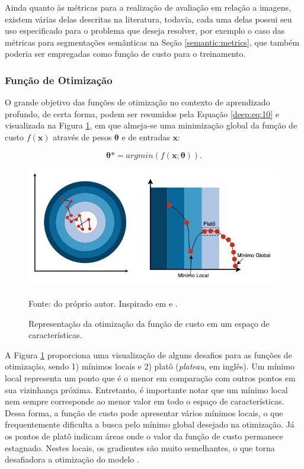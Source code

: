 Ainda quanto às métricas para a realização de avaliação em relação a imagens, existem várias delas descritas na literatura, todavia,  cada uma delas possui seu uso especificado para o problema que deseja resolver, por exemplo o caso das métricas para segmentações semânticas na Seção \ref{semantic:metrics}, que também poderia ser empregadas como função de custo para o treinamento.


\subsubsection{Função de Otimização}
\label{deep:optimization}

O grande objetivo das funções de otimização no contexto de aprendizado profundo, de certa forma, podem ser resumidos pela Equação \ref{deep:eq:10} e visualizada na Figura \ref{deep:fig:otimizacao}, em que almeja-se uma minimização global da função de custo $f(\boldsymbol{x})$ através de pesos $\boldsymbol{\theta}$ e de entradas $\boldsymbol{x}$:

\begin{equation}
    \label{deep:eq:10}
    \boldsymbol{\theta}* = argmin(f(\boldsymbol{x};\boldsymbol{\theta})).
\end{equation}

\begin{figure}[H]
    \centering
    \caption{Representação da otimização da função de custo em um espaço de características.}
    \includegraphics[width=1\linewidth]{recursos/imagens/deep/funcao_otimizacao.png}
    \label{deep:fig:otimizacao}

    Fonte: do próprio autor. Inspirado em \cite{MontesinosLopez2022ArtificialOutcomes} e \cite{Geron2017Hands-onSystems}.
\end{figure}

A Figura \ref{deep:fig:otimizacao} proporciona uma visualização de alguns desafios para as funções de otimização, sendo 1) mínimos locais e 2) platô (\textit{plateau}, em inglês). Um mínimo local representa um ponto que é o menor em comparação com outros pontos em sua vizinhança próxima. Entretanto, é importante notar que um mínimo local nem sempre corresponde ao menor valor em todo o espaço de características. Dessa forma, a função de custo pode apresentar vários mínimos locais, o que frequentemente dificulta a busca pelo mínimo global desejado na otimização\citep{Goodfellow2016}. Já os pontos de platô indicam áreas onde o valor da função de custo permanece estagnado. Nestes locais, os gradientes são muito semelhantes, o que torna desafiadora a otimização do modelo \citep{Goodfellow2016}.

